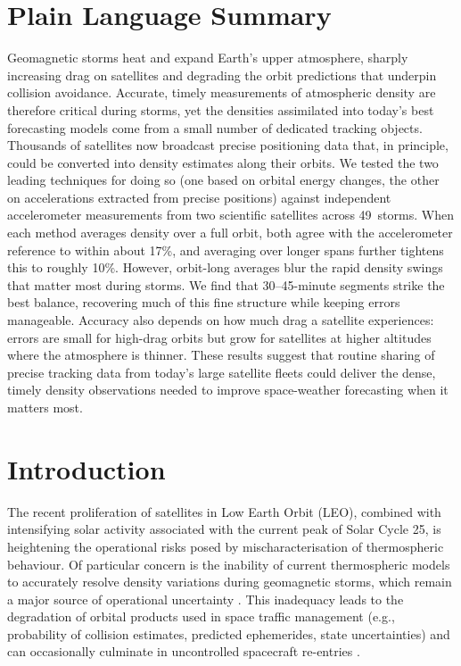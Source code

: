 \documentclass[draft]{agujournal2019}
\begin{document}
\section*{Plain Language Summary}
Geomagnetic storms heat and expand Earth's upper atmosphere, sharply increasing drag on satellites and degrading the orbit predictions that underpin collision avoidance. Accurate, timely measurements of atmospheric density are therefore critical during storms, yet the densities assimilated into today's best forecasting models come from a small number of dedicated tracking objects. Thousands of satellites now broadcast precise positioning data that, in principle, could be converted into density estimates along their orbits. We tested the two leading techniques for doing so (one based on orbital energy changes, the other on accelerations extracted from precise positions) against independent accelerometer measurements from two scientific satellites across 49~storms. When each method averages density over a full orbit, both agree with the accelerometer reference to within about 17\%, and averaging over longer spans further tightens this to roughly 10\%. However, orbit-long averages blur the rapid density swings that matter most during storms. We find that 30--45-minute segments strike the best balance, recovering much of this fine structure while keeping errors manageable. Accuracy also depends on how much drag a satellite experiences: errors are small for high-drag orbits but grow for satellites at higher altitudes where the atmosphere is thinner. These results suggest that routine sharing of precise tracking data from today's large satellite fleets could deliver the dense, timely density observations needed to improve space-weather forecasting when it matters most.

\section{Introduction}

The recent proliferation of satellites in Low Earth Orbit (LEO), combined with intensifying solar activity associated with the current peak of Solar Cycle 25, is heightening the operational risks posed by mischaracterisation of thermospheric behaviour. Of particular concern is the inability of current thermospheric models to accurately resolve density variations during geomagnetic storms, which remain a major source of operational uncertainty \cite{Mehta2017AAtmosphere}. This inadequacy leads to the degradation of orbital products used in space traffic management (e.g., probability of collision estimates, predicted ephemerides, state uncertainties) \cite{Bussy-Virat2018} and can occasionally culminate in uncontrolled spacecraft re-entries \cite{Fang2022Space2022}.
\end{document}
